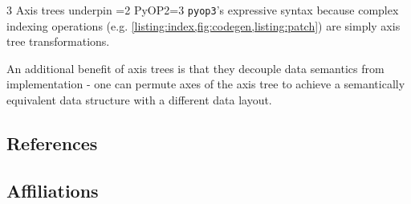 \documentclass[
]{ImperialPoster}
\def\pyop#1{\ifnum#1=2 {PyOP2}\else \ifnum#1=3 {\texttt{pyop3}}\fi \fi}
\newcommand{\myblue}[1]{\textcolor{ICLBlue}{#1}}
\begin{document}
\begin{multicols}{3}
Axis trees underpin \pyop3's expressive syntax because complex indexing operations (e.g. \cref{listing:index,fig:codegen,listing:patch}) are simply axis tree transformations.

An additional benefit of axis trees is that they \myblue{decouple data semantics from implementation} - one can permute axes of the axis tree to achieve a semantically equivalent data structure with a different data layout.

%
%
%
%

\subsection{References}

\vspace{1em}

\begingroup
{}
\setlength\bibitemsep{0pt}
\printbibliography[heading=none]
\endgroup

\subsection{Affiliations}


\end{multicols}
\end{document}
